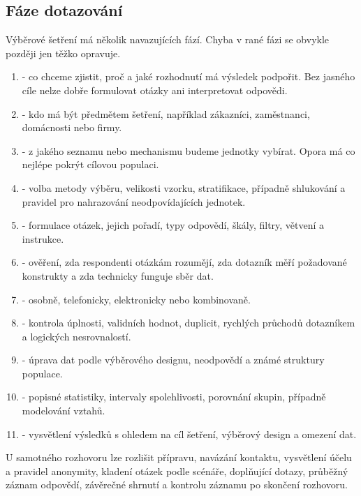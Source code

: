 \subsection{Fáze dotazování}
Výběrové šetření má několik navazujících fází. Chyba v rané fázi se obvykle později jen těžko opravuje.
\begin{enumerate}
  \item {} - co chceme zjistit, proč a jaké rozhodnutí má výsledek podpořit.
  Bez jasného cíle nelze dobře formulovat otázky ani interpretovat odpovědi.
  \item {} - kdo má být předmětem šetření, například zákazníci,
  zaměstnanci, domácnosti nebo firmy.
  \item {} - z jakého seznamu nebo mechanismu budeme jednotky vybírat.
  Opora má co nejlépe pokrýt cílovou populaci.
  \item {} - volba metody výběru, velikosti vzorku, stratifikace,
  případně shlukování a pravidel pro nahrazování neodpovídajících jednotek.
  \item {} - formulace otázek, jejich pořadí, typy odpovědí,
  škály, filtry, větvení a instrukce.
  \item {} - ověření, zda respondenti otázkám rozumějí, zda dotazník měří požadované
  konstrukty a zda technicky funguje sběr dat.
  \item {} - osobně, telefonicky, elektronicky nebo kombinovaně.
  \item {} - kontrola úplnosti, validních hodnot, duplicit, rychlých
  průchodů dotazníkem a logických nesrovnalostí.
  \item {} - úprava dat podle výběrového designu, neodpovědí a známé struktury
  populace.
  \item {} - popisné statistiky, intervaly spolehlivosti, porovnání skupin, případně
  modelování vztahů.
  \item {} - vysvětlení výsledků s ohledem na cíl šetření, výběrový
  design a omezení dat.
\end{enumerate}

U samotného rozhovoru lze rozlišit přípravu, navázání kontaktu, vysvětlení účelu a pravidel
anonymity, kladení otázek podle scénáře, doplňující dotazy, průběžný záznam odpovědí, závěrečné
shrnutí a kontrolu záznamu po skončení rozhovoru.

